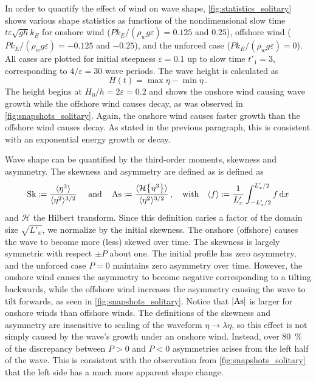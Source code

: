 \documentclass{jfm}
\DeclareMathOperator{\Sk}{Sk}
\DeclareMathOperator{\As}{As}
\newcommand{\hilbert}{\mathcal{H}}
\renewcommand*{\epsilon}{\varepsilon}
\begin{document}
In order to quantify the effect of wind on wave shape,
\cref{fig:statistics_solitary} shows various shape statistics as
functions of the nondimensional slow time $t \epsilon \sqrt{g h} k_E$
for onshore wind ($P k_E/(\rho_w g \epsilon) = 0.125$ and $0.25$),
offshore wind ($P k_E/(\rho_w g \epsilon) = -0.125$ and $-0.25$), and
the unforced case ($P k_E/(\rho_w g \epsilon) = 0$).
All cases are plotted for initial steepness $\epsilon = 0.1$ up to slow
time $t'_1 = 3$, corresponding to $4/\epsilon = 30$ wave periods.
The  wave height is calculated as
\begin{equation}
  H(t) = \max{\eta} - \min{\eta} \,.
  \label{eq:height_def}
\end{equation}
The height  begins at $H_0/h = 2
\epsilon = 0.2$ and shows the onshore wind
causing wave growth while the offshore wind causes decay, as was
observed in \cref{fig:snapshots_solitary}.
Again, the onshore wind causes faster growth than the offshore wind
causes decay.
As stated in the previous paragraph, this is consistent with an
exponential energy growth or decay.

Wave shape can be quantified by the third-order moments, skewness and
asymmetry.
The  skewness and
 asymmetry are defined as is defined
as
\begin{equation}
  \Sk \coloneqq \frac{\langle \eta^3 \rangle}{\langle \eta^2
  \rangle^{3/2}} \
  \qq{and}
  \As \coloneqq \frac{\langle \hilbert \Bqty{\eta^3} \rangle}{\langle
    \eta^2 \rangle^{3/2}} \,,
  \label{eq:shape_stats_def}
  \qq{with}
  \langle f \rangle \coloneqq \frac{1}{L'_x} \int_{-L'_x/2}^{L'_x/2} f
  \dd{x}
\end{equation}
and $\hilbert$ the Hilbert transform.
Since this definition caries a factor of the
domain size $\sqrt{L'_x}$, we normalize by the initial skewness.
The onshore (offshore) causes the wave to become more (less) skewed over
time.
The skewness is largely symmetric with respect $\pm P$ about one.
The initial profile has zero asymmetry, and the unforced case
$P=0$ maintains zero asymmetry over time.
However, the onshore wind causes the asymmetry to become negative
corresponding to a tilting backwards, while the offshore wind increases
the asymmetry causing the wave to tilt forwards, as seen in
\cref{fig:snapshots_solitary}.
Notice that $\abs{\As}$ is larger for onshore winds than offshore winds.
The definitions of the skewness and asymmetry are insensitive to scaling
of the waveform $\eta \to \lambda \eta$, so this effect is not simply
caused by the wave's growth under an onshore wind.
Instead, over \SI{80}{\percent} of the discrepancy between $P>0$
and $P<0$ asymmetries arises from the left half of the wave.
This is consistent with the observation from
\cref{fig:snapshots_solitary} that the left side has a much more
apparent shape change.
\end{document}

